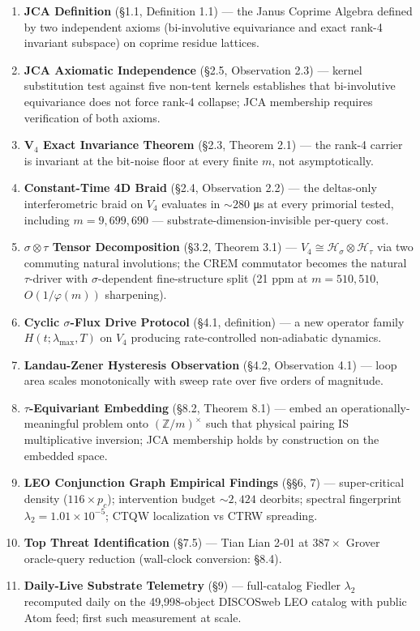 \documentclass[
]{article}
\providecommand{\tightlist}{%
  \setlength{\itemsep}{0pt}\setlength{\parskip}{0pt}}
\begin{document}
\begin{enumerate}
\def\labelenumi{\arabic{enumi}.}
\tightlist
\item
  \textbf{JCA Definition} (§1.1, Definition 1.1) --- the Janus Coprime
  Algebra defined by two independent axioms (bi-involutive equivariance
  and exact rank-4 invariant subspace) on coprime residue lattices.
\item
  \textbf{JCA Axiomatic Independence} (§2.5, Observation 2.3) --- kernel
  substitution test against five non-tent kernels establishes that
  bi-involutive equivariance does not force rank-4 collapse; JCA
  membership requires verification of both axioms.
\item
  \textbf{V\(_4\) Exact Invariance Theorem} (§2.3, Theorem 2.1) --- the
  rank-4 carrier is invariant at the bit-noise floor at every finite
  \(m\), not asymptotically.
\item
  \textbf{Constant-Time 4D Braid} (§2.4, Observation 2.2) --- the
  deltas-only interferometric braid on \(V_4\) evaluates in \(\sim 280\)
  μs at every primorial tested, including \(m = 9{,}699{,}690\) ---
  substrate-dimension-invisible per-query cost.
\item
  \textbf{\(\sigma\otimes\tau\) Tensor Decomposition} (§3.2, Theorem
  3.1) --- \(V_4 \cong \mathcal{H}_\sigma \otimes \mathcal{H}_\tau\) via
  two commuting natural involutions; the CREM commutator becomes the
  natural \(\tau\)-driver with \(\sigma\)-dependent fine-structure split
  (21 ppm at \(m = 510{,}510\), \(O(1/\varphi(m))\) sharpening).
\item
  \textbf{Cyclic \(\sigma\)-Flux Drive Protocol} (§4.1, definition) ---
  a new operator family \(H(t; \lambda_\text{max}, T)\) on \(V_4\)
  producing rate-controlled non-adiabatic dynamics.
\item
  \textbf{Landau-Zener Hysteresis Observation} (§4.2, Observation 4.1)
  --- loop area scales monotonically with sweep rate over five orders of
  magnitude.
\item
  \textbf{\(\tau\)-Equivariant Embedding} (§8.2, Theorem 8.1) --- embed
  an operationally-meaningful problem onto \((\mathbb{Z}/m)^\times\)
  such that physical pairing IS multiplicative inversion; JCA membership
  holds by construction on the embedded space.
\item
  \textbf{LEO Conjunction Graph Empirical Findings} (§§6, 7) ---
  super-critical density (\(116 \times p_c\)); intervention budget
  \(\sim 2{,}424\) deorbits; spectral fingerprint
  \(\lambda_2 = 1.01 \times 10^{-5}\); CTQW localization vs CTRW
  spreading.
\item
  \textbf{Top Threat Identification} (§7.5) --- Tian Lian 2-01 at
  \(387\times\) Grover oracle-query reduction (wall-clock conversion:
  §8.4).
\item
  \textbf{Daily-Live Substrate Telemetry} (§9) --- full-catalog Fiedler
  \(\lambda_2\) recomputed daily on the 49,998-object DISCOSweb LEO
  catalog with public Atom feed; first such measurement at scale.
\end{enumerate}
\end{document}
